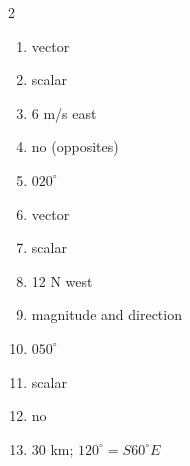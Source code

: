 \documentclass[11pt]{article}
\begin{document}
\begin{keybox}
\begin{multicols}{2}
\small
\begin{enumerate}[leftmargin=*,itemsep=3pt]
  \item vector
  \item scalar
  \item 6 m/s east
  \item no (opposites)
  \item $020^\circ$
  \item vector
  \item scalar
  \item 12 N west
  \item magnitude and direction
  \item $050^\circ$
  \item scalar
  \item no
  \item 30 km; $120^\circ=S60^\circ E$
\end{enumerate}
\end{multicols}
\end{keybox}
\end{document}
